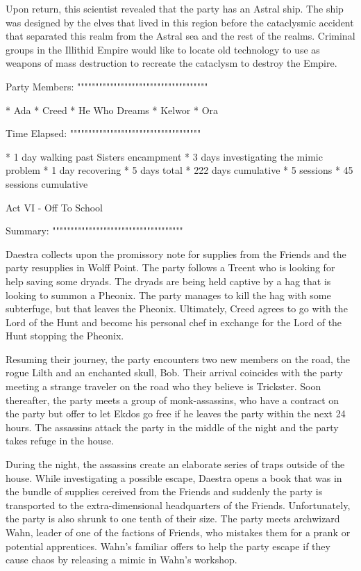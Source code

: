 Upon return, this scientist revealed that the party has an Astral ship.
The ship was designed by the elves that lived in this region before the cataclysmic accident that separated this realm from the Astral sea and the rest of the realms.
Criminal groups in the Illithid Empire would like to locate old technology to use as weapons of mass destruction to recreate the cataclysm to destroy the Empire.

Party Members:
""""""""""""""""""""""""""""""""""""

  * Ada
  * Creed
  * He Who Dreams
  * Kelwor
  * Ora

Time Elapsed:
""""""""""""""""""""""""""""""""""""

  * 1 day walking past Sisters encampment
  * 3 days investigating the mimic problem
  * 1 day recovering
  * 5 days total
  * 222 days cumulative
  * 5 sessions
  * 45 sessions cumulative

Act VI - Off To School
^^^^^^^^^^^^^^^^^^^^^^^^^^^^^^^^^^^^

Summary:
""""""""""""""""""""""""""""""""""""

Daestra collects upon the promissory note for supplies from the Friends and the party resupplies in Wolff Point.
The party follows a Treent who is looking for help saving some dryads.
The dryads are being held captive by a hag that is looking to summon a Pheonix.
The party manages to kill the hag with some subterfuge, but that leaves the Pheonix.
Ultimately, Creed agrees to go with the Lord of the Hunt and become his personal chef in exchange for the Lord of the Hunt stopping the Pheonix.

Resuming their journey, the party encounters two new members on the road, the rogue Lilth and an enchanted skull, Bob.
Their arrival coincides with the party meeting a strange traveler on the road who they believe is Trickster.
Soon thereafter, the party meets a group of monk-assassins, who have a contract on the party but offer to let Ekdos go free if he leaves the party within the next 24 hours.
The assassins attack the party in the middle of the night and the party takes refuge in the house.

During the night, the assassins create an elaborate series of traps outside of the house.
While investigating a possible escape, Daestra opens a book that was in the bundle of supplies cereived from the Friends and suddenly the party is transported to the extra-dimensional headquarters of the Friends.
Unfortunately, the party is also shrunk to one tenth of their size.
The party meets archwizard Wahn, leader of one of the factions of Friends, who mistakes them for a prank or potential apprentices.
Wahn's familiar offers to help the party escape if they cause chaos by releasing a mimic in Wahn's workshop.

